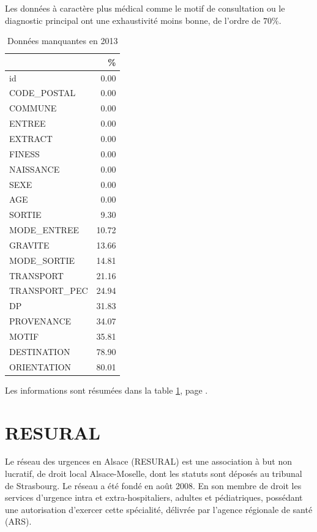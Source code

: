 \documentclass[12pt,english,french,twoside]{report}\usepackage[]{graphicx}\usepackage[]{color}
\begin{document}
Les données à caractère plus médical comme le motif de consultation ou le diagnostic principal ont une exhaustivité moins bonne, de l'ordre de $70\%$.

\begin{table}[ht]
\centering
\begin{tabular}{|l|r|}
  \hline
 & \% \\ 
  \hline
id & 0.00 \\ 
  CODE\_POSTAL & 0.00 \\ 
  COMMUNE & 0.00 \\ 
  ENTREE & 0.00 \\ 
  EXTRACT & 0.00 \\ 
  FINESS & 0.00 \\ 
  NAISSANCE & 0.00 \\ 
  SEXE & 0.00 \\ 
  AGE & 0.00 \\ 
  SORTIE & 9.30 \\ 
  MODE\_ENTREE & 10.72 \\ 
  GRAVITE & 13.66 \\ 
  MODE\_SORTIE & 14.81 \\ 
  TRANSPORT & 21.16 \\ 
  TRANSPORT\_PEC & 24.94 \\ 
  DP & 31.83 \\ 
  PROVENANCE & 34.07 \\ 
  MOTIF & 35.81 \\ 
  DESTINATION & 78.90 \\ 
  ORIENTATION & 80.01 \\ 
   \hline
\end{tabular}
\caption{Données manquantes en 2013} 
\label{tab2}
\end{table}




Les informations sont résumées dans la table \ref{tab2}, page \pageref{tab2}.

\chapter{RESURAL}


Le réseau des urgences en Alsace (RESURAL) est une association à but non lucratif, de droit local Alsace-Moselle, dont les statuts sont déposés au tribunal de Strasbourg. Le réseau a été fondé en août 2008. En son membre de droit les services d'urgence intra et extra-hospitaliers, adultes et pédiatriques, possédant une autorisation d'exercer cette spécialité, délivrée par l'agence régionale de santé (ARS). 
\end{document}
